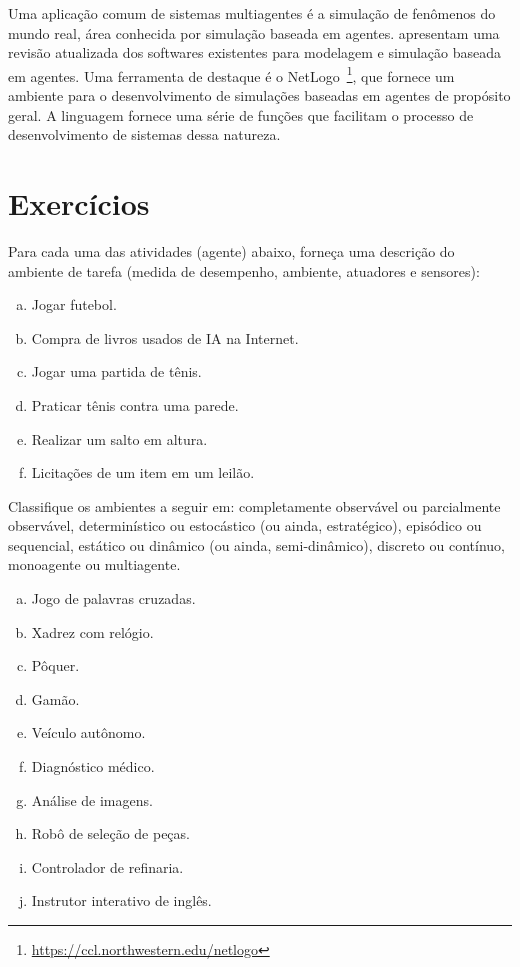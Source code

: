 Uma aplicação comum de sistemas multiagentes é a simulação de fenômenos do mundo real, área conhecida por simulação baseada em agentes. \cite{AbarEtAl2017} apresentam uma revisão atualizada dos softwares existentes para modelagem e simulação baseada em agentes. Uma ferramenta de destaque é o NetLogo~\footnote{\url{https://ccl.northwestern.edu/netlogo}}, que fornece um ambiente para o desenvolvimento de simulações baseadas em agentes de propósito geral. A linguagem fornece uma série de funções que facilitam o processo de desenvolvimento de sistemas dessa natureza.

\section{Exercícios}

\resetexercisenumbering

\begin{exercise}
Para cada uma das atividades (agente) abaixo, forneça uma descrição do ambiente de tarefa (medida de desempenho, ambiente, atuadores e sensores):
\begin{enumerate}[a.]
	\item Jogar futebol.
	\item Compra de livros usados de IA na Internet.
	\item Jogar uma partida de tênis.
	\item Praticar tênis contra uma parede.
	\item Realizar um salto em altura.
	\item Licitações de um item em um leilão.
\end{enumerate}
\end{exercise}

\begin{exercise}
Classifique os ambientes a seguir em: completamente observável ou parcialmente observável, determinístico ou estocástico (ou ainda, estratégico), episódico ou sequencial, estático ou dinâmico (ou ainda, semi-dinâmico), discreto ou contínuo, monoagente ou multiagente.

\begin{enumerate}[a.]
	\item Jogo de palavras cruzadas.
	\item Xadrez com relógio.
	\item Pôquer.
	\item Gamão.
	\item Veículo autônomo.
	\item Diagnóstico médico.
	\item Análise de imagens.
	\item Robô de seleção de peças.
	\item Controlador de refinaria.
	\item Instrutor interativo de inglês.
\end{enumerate}
\end{exercise}

